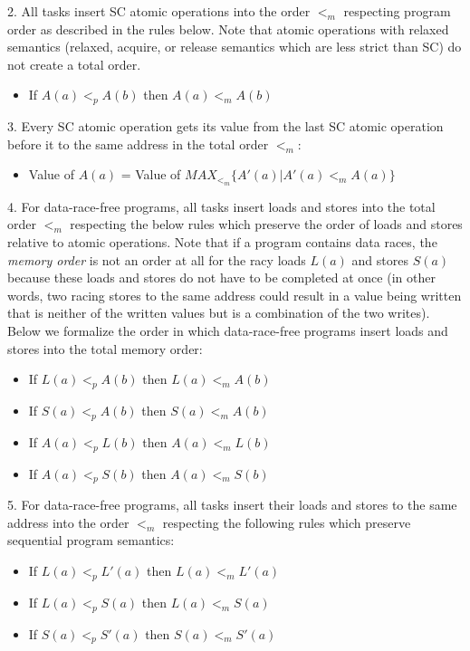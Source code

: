 2. All tasks insert SC atomic operations into the order $<_m$ respecting
program order as described in the rules below. Note that atomic operations with
relaxed semantics (relaxed, acquire, or release semantics which are less strict
than SC) do not create a total order.

\begin{itemize}
  \item If $A(a)<_pA(b)$ then $A(a)<_mA(b)$
\end{itemize}

3. Every SC atomic operation gets its value from the last SC atomic operation before it to the same address in the total order $<_m$:
\begin{itemize}
  \item Value of $A(a)$ = Value of $MAX_{<_m} \{A'(a)|A'(a) <_m A(a) \}$
\end{itemize}

4. For data-race-free programs, all tasks insert loads and stores into the
total order $<_m$ respecting the below rules which preserve the order of loads
and stores relative to atomic operations.  Note that if a program contains data
races, the \textit{memory order} is not an order at all for the racy loads
$L(a)$ and stores $S(a)$ because these loads and stores do not have to be
completed at once (in other words, two racing stores to the same address could
result in a value being written that is neither of the written values but is a
combination of the two writes). Below we formalize the order in which data-race-free programs insert loads and stores into the total memory order:
\begin{itemize}
  \item If $L(a)<_pA(b)$ then $L(a)<_mA(b)$
  \item If $S(a)<_pA(b)$ then $S(a)<_mA(b)$
  \item If $A(a)<_pL(b)$ then $A(a)<_mL(b)$
  \item If $A(a)<_pS(b)$ then $A(a)<_mS(b)$
\end{itemize}

5. For data-race-free programs, all tasks insert their loads and stores to the
same address into the order $<_m$ respecting the following rules which preserve
sequential program semantics:

\begin{itemize}
  \item If $L(a) <_p L'(a)$ then $L(a) <_m L'(a)$
  \item If $L(a) <_p S(a)$ then $L(a) <_m S(a)$
  \item If $S(a) <_p S'(a)$ then $S(a) <_m S'(a)$
\end{itemize}

